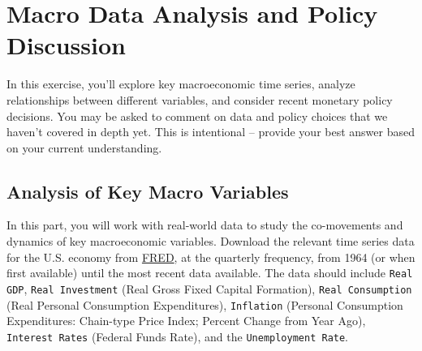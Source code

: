 \documentclass[dvipsnames,11pt]{article}
\begin{document}
\section{Macro Data Analysis and Policy Discussion}

    In this exercise, you'll explore key macroeconomic time series, analyze relationships between different variables, and consider recent monetary policy decisions. You may be asked to comment on data and policy choices that we haven't covered in depth yet. This is intentional -- provide your best answer based on your current understanding.

    \subsection{Analysis of Key Macro Variables}

        In this part, you will work with real-world data to study the co-movements and dynamics of key macroeconomic variables. Download the relevant time series data for the U.S. economy from \href{https://fred.stlouisfed.org/}{FRED}, at the quarterly frequency, from 1964 (or when first available) until the most recent data available. The data should include \texttt{Real GDP}, \texttt{Real Investment} (Real Gross Fixed Capital Formation), \texttt{Real Consumption} (Real Personal Consumption Expenditures), \texttt{Inflation} (Personal Consumption Expenditures: Chain-type Price Index; Percent Change from Year Ago), \texttt{Interest Rates} (Federal Funds Rate), and the \texttt{Unemployment Rate}.
\end{document}

